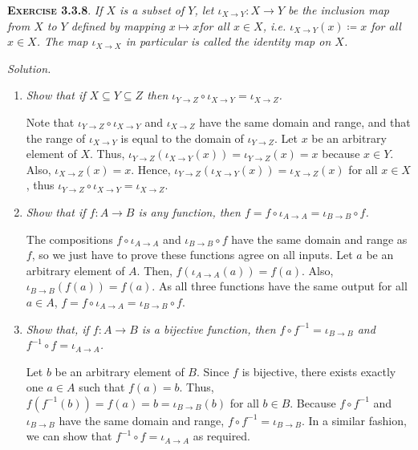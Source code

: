 \documentclass[12pt]{article}
\theoremstyle{remark}
\newenvironment{exer}[2]{
    \noindent \setlength{\parskip}{1em}%
    \textsc{\textbf{Exercise #1}}. \textit{#2} \par
    \noindent \textit{Solution.} %
}{\bigskip}
\begin{document}
\begin{exer}{3.3.8}{
    If $X$ is a subset of $Y$, let $\iota_{X \to Y} : X \to Y$ be the \emph{inclusion map from $X$ to $Y$} defined by mapping $x \mapsto x$for all $x \in X$, i.e. $\iota_{X \to Y}(x) \coloneqq x$ for all $x \in X$.
    The map $\iota_{X \to X}$ in particular is called the \emph{identity map} on $X$.
}
    \begin{enumerate}[topsep=0mm, label=(\alph*)]
        \item \textit{Show that if $X \subseteq Y \subseteq Z$ then $\iota_{Y \to Z} \circ \iota_{X \to Y} = \iota_{X \to Z}$.}

            Note that $\iota_{Y \to Z} \circ \iota_{X \to Y}$ and $\iota_{X \to Z}$ have the same domain and range, and that the range of $\iota_{X \to Y}$ is equal to the domain of $\iota_{Y \to Z}$.
            Let $x$ be an arbitrary element of $X$.
            Thus, $\iota_{Y \to Z}(\iota_{X \to Y}(x)) = \iota_{Y \to Z}(x) = x$ because $x \in Y$.
            Also, $\iota_{X \to Z}(x) = x$.
            Hence, $\iota_{Y \to Z}(\iota_{X \to Y}(x)) = \iota_{X \to Z}(x)$ for all $x \in X$, thus $\iota_{Y \to Z} \circ \iota_{X \to Y} = \iota_{X \to Z}$.

        \item \textit{Show that if $f : A \to B$ is any function, then $f = f \circ \iota_{A \to A} = \iota_{B \to B} \circ f$.}

            The compositions $f \circ \iota_{A \to A}$ and $\iota_{B \to B} \circ f$ have the same domain and range as $f$, so we just have to prove these functions agree on all inputs.
            Let $a$ be an arbitrary element of $A$.
            Then, $f(\iota_{A \to A}(a)) = f(a)$.
            Also, $\iota_{B \to B}(f(a)) = f(a)$.
            As all three functions have the same output for all $a \in A$, $f = f \circ \iota_{A \to A} = \iota_{B \to B} \circ f$.

        \item \textit{Show that, if $f : A \to B$ is a bijective function, then $f \circ f^{-1} = \iota_{B \to B}$ and $f^{-1} \circ f = \iota_{A \to A}$.}

            Let $b$ be an arbitrary element of $B$.
            Since $f$ is bijective, there exists exactly one $a \in A$ such that $f(a) = b$.
            Thus, $f(f^{-1}(b)) = f(a) = b = \iota_{B \to B}(b)$ for all $b \in B$.
            Because $f \circ f^{-1}$ and $\iota_{B \to B}$ have the same domain and range, $f \circ f^{-1} = \iota_{B \to B}$.
            In a similar fashion, we can show that $f^{-1} \circ f = \iota_{A \to A}$ as required.


\end{enumerate}
\end{exer}
\end{document}
